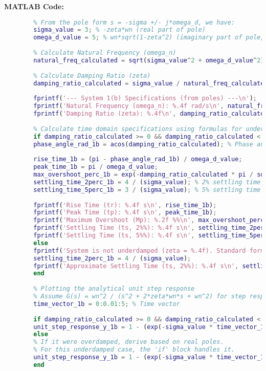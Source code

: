 \documentclass{article}
\begin{document}
	\textbf{MATLAB Code:}
	\begin{lstlisting}[language=Matlab, caption=MATLAB Code for Problem 1(b) (Using Formulas)]
		% Given pole: S = -3 - j5. This implies a conjugate pair: -3 +/- j5.
		% From the pole form s = -sigma +/- j*omega_d, we have:
		sigma_value = 3; % -zeta*wn (real part of pole)
		omega_d_value = 5; % wn*sqrt(1-zeta^2) (imaginary part of pole, damped frequency)
		
		% Calculate Natural Frequency (omega_n)
		natural_freq_calculated = sqrt(sigma_value^2 + omega_d_value^2); % wn^2 = sigma^2 + omega_d^2
		
		% Calculate Damping Ratio (zeta)
		damping_ratio_calculated = sigma_value / natural_freq_calculated;
		
		fprintf('--- System 1(b) Specifications (from poles) ---\n');
		fprintf('Natural Frequency (omega_n): %.4f rad/s\n', natural_freq_calculated);
		fprintf('Damping Ratio (zeta): %.4f\n', damping_ratio_calculated);
		
		% Calculate time domain specifications using formulas for underdamped system
		if damping_ratio_calculated >= 0 && damping_ratio_calculated < 1
		phase_angle_rad_1b = acos(damping_ratio_calculated); % Phase angle in radians
		
		rise_time_1b = (pi - phase_angle_rad_1b) / omega_d_value;
		peak_time_1b = pi / omega_d_value;
		max_overshoot_perc_1b = exp(-damping_ratio_calculated * pi / sqrt(1 - damping_ratio_calculated^2)) * 100;
		settling_time_2perc_1b = 4 / (sigma_value); % 2% settling time (4 / (zeta*wn))
		settling_time_5perc_1b = 3 / (sigma_value); % 5% settling time
		
		fprintf('Rise Time (tr): %.4f s\n', rise_time_1b);
		fprintf('Peak Time (tp): %.4f s\n', peak_time_1b);
		fprintf('Maximum Overshoot (Mp): %.2f %%\n', max_overshoot_perc_1b);
		fprintf('Settling Time (ts, 2%%): %.4f s\n', settling_time_2perc_1b);
		fprintf('Settling Time (ts, 5%%): %.4f s\n', settling_time_5perc_1b);
		else
		fprintf('System is not underdamped (zeta = %.4f). Standard formulas for tp, Mp not applicable.\n', damping_ratio_calculated);
		settling_time_2perc_1b = 4 / (sigma_value);
		fprintf('Approximate Settling Time (ts, 2%%): %.4f s\n', settling_time_2perc_1b);
		end
		
		% Plotting the analytical unit step response
		% Assume G(s) = wn^2 / (s^2 + 2*zeta*wn*s + wn^2) for step response
		time_vector_1b = 0:0.01:5; % Time vector
		
		if damping_ratio_calculated >= 0 && damping_ratio_calculated < 1
		unit_step_response_y_1b = 1 - (exp(-sigma_value * time_vector_1b) ./ sqrt(1 - damping_ratio_calculated^2)) .* sin(omega_d_value * time_vector_1b + phase_angle_rad_1b);
		else 
		% If it were overdamped, derive based on real poles.
		% For this underdamped case, the 'if' block handles it.
		unit_step_response_y_1b = 1 - (exp(-sigma_value * time_vector_1b) ./ sqrt(1 - damping_ratio_calculated^2)) .* sin(omega_d_value * time_vector_1b + phase_angle_rad_1b);
		end
		

\end{lstlisting}
\end{document}
